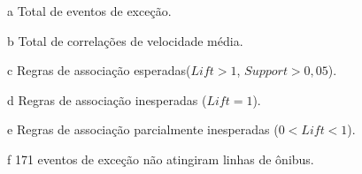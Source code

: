 \documentclass[
	12pt,				%
	oneside,			%
	a4paper,			%
	english,			%
	brazil				%
	]{abntex2ppgsi}
\begin{document}
{{{\begin{apendicesenv}
\begin{table}[!htb]
\begin{threeparttable}
\begin{tablenotes}
            \item[a] Total de eventos de exceção.
            \item[b] Total de correlações de velocidade média.
            \item[c] Regras de associação esperadas($Lift > 1$, $Support > 0,05$).
            \item[d] Regras de associação inesperadas ($Lift = 1$).
            \item[e] Regras de associação parcialmente inesperadas ($0 < Lift < 1$).
            \item[f] 171 eventos de exceção não atingiram linhas de ônibus.
        \end{tablenotes}
\end{threeparttable}
\end{table}


\end{apendicesenv}}}}
\end{document}
